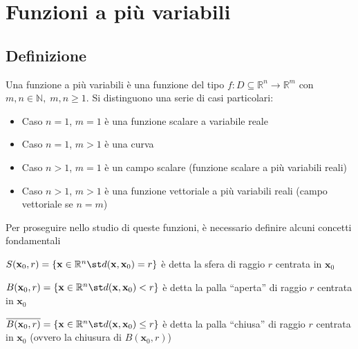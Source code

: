 
\section{Funzioni a più variabili}
    \subsection{Definizione}
        Una funzione a più variabili è una funzione del tipo $f: D \subseteq \mathbb{R}^{n} \rightarrow \mathbb{R}^{m}$ con $m, n \in \mathbb{N}, \; m, n \geq 1$. Si distinguono una serie di casi particolari:
        \begin{itemize}
            \item Caso $n = 1$, $m = 1$ è una funzione scalare a variabile reale
            \item Caso $n = 1$, $m > 1$ è una curva
            \item Caso $n > 1$, $m = 1$ è un campo scalare (funzione scalare a più variabili reali)
            \item Caso $n > 1$, $m > 1$ è una funzione vettoriale a più variabili reali (campo vettoriale se $n = m$)
        \end{itemize}

        Per proseguire nello studio di queste funzioni, è necessario definire alcuni concetti fondamentali
        \begin{definition}
            $S(\mathbf{x}_0, r) = \{ \mathbf{x} \in \mathbb{R}^{n} \st d(\mathbf{x}, \mathbf{x}_0) = r \}$ è detta la sfera di raggio $r$ centrata in $\mathbf{x}_0$
        \end{definition}
        \begin{definition}
            $B(\mathbf{x}_0, r) = \{ \mathbf{x} \in \mathbb{R}^{n} \st d(\mathbf{x}, \mathbf{x}_0) < r \}$ è detta la palla ``aperta'' di raggio $r$ centrata in $\mathbf{x}_0$
        \end{definition}
        \begin{definition}
            $\overline{B(\mathbf{x}_0, r)} = \{ \mathbf{x} \in \mathbb{R}^{n} \st d(\mathbf{x}, \mathbf{x}_0) \leq r \}$ è detta la palla ``chiusa'' di raggio $r$ centrata in $\mathbf{x}_0$ (ovvero la chiusura di $B(\mathbf{x}_0, r)$)
        \end{definition}

